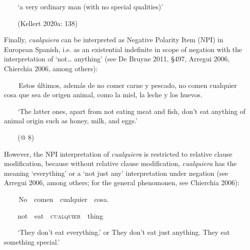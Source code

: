 \begin{styleStandard}
\ \ \ \ ‘a very ordinary man (with no special qualities)’\ \ 
\end{styleStandard}

\begin{styleStandard}
\ \ \ \ (Kellert 2020a: 138)
\end{styleStandard}

\begin{styleStandard}
Finally, \textit{cualquiera} can be interpreted as Negative Polarity Item (NPI) in European Spanish, i.e. as an existential indefinite in scope of negation with the interpretation of ‘not… anything’ (see De Bruyne 2011, §497, Arregui 2006, Chierchia 2006, among others):
\end{styleStandard}

\clearpage\begin{styleStandard}
\textbf{\ \ }\ \ Estos últimos, además de no comer carne y pescado, no comen cualquier cosa que sea de origen animal, como la miel, la leche y los huevos.
\end{styleStandard}

\begin{styleStandard}
\ \ \ \ ‘The latter ones, apart from not eating meat and fish, don’t eat anything of animal origin such as honey, milk, and eggs.’
\end{styleStandard}

\begin{styleStandard}
\ \ \ \ (@ 8)
\end{styleStandard}

\begin{styleStandard}
However, the NPI interpretation of \textit{cualquiera} is restricted to relative clause modification, because without relative clause modification, \textit{cualquiera} has the meaning ‘everything’ or a ‘not just any’ interpretation under negation (see Arregui 2006, among others; for the general phenomonen, see Chierchia 2006):
\end{styleStandard}

\clearpage\begin{styleStandard}
\textbf{\ \ }\ \ No\ \ comen\ \ cualquier\ \ cosa.
\end{styleStandard}

\begin{styleStandard}
\ \ \ \ not\ \ eat\ \ \textsc{cualquier}\ \ thing
\end{styleStandard}

\begin{styleStandard}
\ \ \ \ ‘They don’t eat everything.’ or They don’t eat just anything. They eat something special.’
\end{styleStandard}

